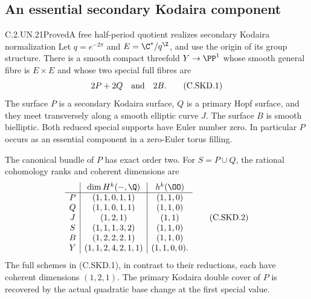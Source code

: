 \subsection{An essential secondary Kodaira component}

\begin{statement}{C.2.UN.21}{Proved}{A free half-period quotient realizes secondary Kodaira normalization}
Let $q=e^{-2\pi}$ and $E=\C^*/q^{\Z}$, and use the
origin of its group structure. There is a smooth compact
threefold $Y\to\PP^1$ whose smooth general fibre is
$E\times E$ and whose two special full fibres are
\[
                        2P+2Q\quad\hbox{and}\quad 2B.
                                                            \tag{C.SKD.1}
\]
The surface $P$ is a secondary Kodaira surface, $Q$ is
a primary Hopf surface, and they meet transversely along
a smooth elliptic curve $J$. The surface $B$ is smooth
bielliptic. Both reduced special supports have Euler
number zero. In particular $P$ occurs as an essential
component in a zero-Euler torus filling.

The canonical bundle of $P$ has exact order two. For
$S=P\cup Q$, the rational cohomology ranks and coherent
dimensions are
\[
 \begin{array}{c|c|c}
 &\dim H^k(-,\Q)&h^k(\OO)\\ \hline
 P&(1,1,0,1,1)&(1,1,0)\\
 Q&(1,1,0,1,1)&(1,1,0)\\
 J&(1,2,1)&(1,1)\\
 S&(1,1,1,3,2)&(1,1,0)\\
 B&(1,2,2,2,1)&(1,1,0)\\
 Y&(1,1,2,4,2,1,1)&(1,1,0,0).
 \end{array}                                             \tag{C.SKD.2}
\]
The full schemes in (C.SKD.1), in contrast to their
reductions, each have coherent dimensions $(1,2,1)$.
The primary Kodaira double cover of $P$ is recovered
by the actual quadratic base change at the first
special value.
\end{statement}
